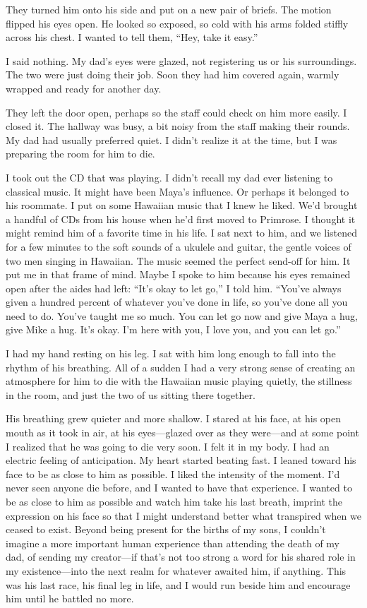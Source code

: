 \documentclass[12pt]{book}
\begin{document}
They turned him onto his side and put on a new pair of briefs. The motion flipped his eyes open. He looked so exposed, so cold with his arms folded stiffly across his chest. I wanted to tell them, ``Hey, take it easy.''

I said nothing. My dad's eyes were glazed, not registering us or his surroundings. The two were just doing their job. Soon they had him covered again, warmly wrapped and ready for another day.

They left the door open, perhaps so the staff could check on him more easily. I closed it. The hallway was busy, a bit noisy from the staff making their rounds. My dad had usually preferred quiet. I didn't realize it at the time, but I was preparing the room for him to die.

I took out the CD that was playing. I didn't recall my dad ever listening to classical music. It might have been Maya's influence. Or perhaps it belonged to his roommate. I put on some Hawaiian music that I knew he liked. We'd brought a handful of CDs from his house when he'd first moved to Primrose. I thought it might remind him of a favorite time in his life. I sat next to him, and we listened for a few minutes to the soft sounds of a ukulele and guitar, the gentle voices of two men singing in Hawaiian. The music seemed the perfect send-off for him. It put me in that frame of mind. Maybe I spoke to him because his eyes remained open after the aides had left: ``It's okay to let go,'' I told him. ``You've always given a hundred percent of whatever you've done in life, so you've done all you need to do. You've taught me so much. You can let go now and give Maya a hug, give Mike a hug. It's okay. I'm here with you, I love you, and you can let go.''

I had my hand resting on his leg. I sat with him long enough to fall into the rhythm of his breathing. All of a sudden I had a very strong sense of creating an atmosphere for him to die with the Hawaiian music playing quietly, the stillness in the room, and just the two of us sitting there together.

His breathing grew quieter and more shallow. I stared at his face, at his open mouth as it took in air, at his eyes---glazed over as they were---and at some point I realized that he was going to die very soon. I felt it in my body. I had an electric feeling of anticipation. My heart started beating fast. I leaned toward his face to be as close to him as possible. I liked the intensity of the moment. I'd never seen anyone die before, and I wanted to have that experience. I wanted to be as close to him as possible and watch him take his last breath, imprint the expression on his face so that I might understand better what transpired when we ceased to exist. Beyond being present for the births of my sons, I couldn't imagine a more important human experience than attending the death of my dad, of sending my creator---if that's not too strong a word for his shared role in my existence---into the next realm for whatever awaited him, if anything. This was his last race, his final leg in life, and I would run beside him and encourage him until he battled no more.
\end{document}
